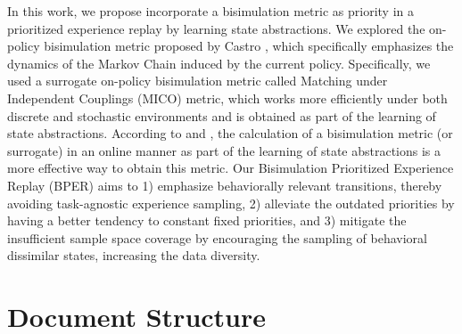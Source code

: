 In this work, we propose incorporate a bisimulation metric as priority in a prioritized experience replay by learning state abstractions. We explored the on-policy bisimulation metric proposed by Castro \cite{castro2020scalable}, which specifically emphasizes the dynamics of the Markov Chain induced by the current policy. Specifically, we used a surrogate on-policy bisimulation metric called Matching under Independent Couplings (MICO) \cite{castro2021mico} metric, which works more efficiently under both discrete and stochastic environments and is obtained as part of the learning of state abstractions. According to \cite{zhang2020learning} and \cite{castro2021mico}, the calculation of a bisimulation metric (or surrogate) in an online manner as part of the learning of state abstractions is a more effective way to obtain this metric. Our Bisimulation Prioritized Experience Replay (BPER) aims to 1) emphasize behaviorally relevant transitions, thereby avoiding task-agnostic experience sampling, 2) alleviate the outdated priorities by having a better tendency to constant fixed priorities, and 3) mitigate the insufficient sample space coverage by encouraging the sampling of behavioral dissimilar states, increasing the data diversity.

\section{Document Structure}




